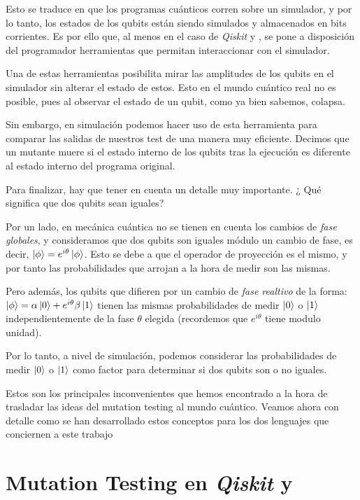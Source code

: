 Esto se traduce en que los programas cuánticos corren sobre un simulador, y por lo tanto, los estados de los qubits están siendo simulados y almacenados en bits corrientes. Es por ello que, al menos en el caso de \textit{Qiskit} y \qsh, se pone a disposición del programador herramientas que permitan interaccionar con el simulador.

Una de estas herramientas posibilita mirar las amplitudes de los qubits en el simulador sin alterar el estado de estos. Esto en el mundo cuántico real no es posible, pues al observar el estado de un qubit, como ya bien sabemos, colapsa.

Sin embargo, en simulación podemos hacer uso de esta herramienta para comparar las salidas de nuestros test de una manera muy eficiente. Decimos que un mutante muere si el estado interno de los qubits tras la ejecución es diferente al estado interno del programa original.

Para finalizar, hay que tener en cuenta un detalle muy importante. ¿ Qué significa que dos qubits sean iguales?

Por un lado, en mecánica cuántica no se tienen en cuenta los cambios de \textit{fase globales}, y consideramos que dos qubits son iguales módulo un cambio de fase, es decir, $\left|\phi\right\rangle =e^{i\theta}\left|\phi\right\rangle$. Esto se debe a que el operador de proyección es el mismo, y por tanto las probabilidades que arrojan a la hora de medir son las mismas.

Pero además, los qubits que difieren por un cambio de \textit{fase realtivo} de la forma: $\left|\phi\right\rangle= \alpha\left|0\right\rangle + e^{i\theta}\beta\left|1\right\rangle$ tienen las mismas probabilidades de medir $\left|0\right\rangle$ o $\left|1\right\rangle$ independientemente de la fase $\theta$ elegida (recordemos que $e^{i\theta}$ tiene modulo unidad).

Por lo tanto, a nivel de simulación, podemos considerar las probabilidades de medir $\left|0\right\rangle$ o $\left|1\right\rangle$ como factor para determinar si dos qubits son o no iguales.

Estos son los principales inconvenientes que hemos encontrado a la hora de trasladar las ideas del mutation testing al mundo cuántico. Veamos ahora con detalle como se han desarrollado estos conceptos para los dos lenguajes que conciernen a este trabajo

\section{Mutation Testing en \textit{Qiskit} y \qsh}

